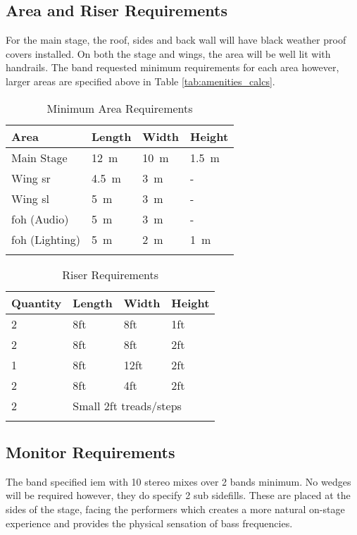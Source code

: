     \subsection{Area and Riser Requirements}
    For the main stage, the roof, sides and back wall will have black weather proof covers installed. On both the stage and wings, the area will be well lit with handrails. The band requested minimum requirements for each area however, larger areas are specified above in Table \ref{tab:amenities_calcs}.

    \begin{longtable}[H]{|l|l|l|l|}
        \hline
        \textbf{Area} & \textbf{Length} & \textbf{Width} & \textbf{Height} \\ \hline
        \endfirsthead
        \endhead
        Main Stage & \SI{12}{\metre} & \SI{10}{\metre} & \SI{1.5}{\metre} \\ \hline
        Wing \gls{sr} & \SI{4.5}{\metre} & \SI{3}{\metre} & - \\ \hline
        Wing \gls{sl} & \SI{5}{\metre} & \SI{3}{\metre} & - \\ \hline
        \gls{foh} (Audio) & \SI{5}{\metre} & \SI{3}{\metre} & - \\ \hline
        \gls{foh} (Lighting) & \SI{5}{\metre} & \SI{2}{\metre} & \SI{1}{\metre} \\ \hline
        \caption{Minimum Area Requirements}
        \label{tab:area_requirements}
    \end{longtable}

    \begin{longtable}[H]{|l|lll|}
        \hline
        \textbf{Quantity} & \multicolumn{1}{l|}{\textbf{Length}} & \multicolumn{1}{l|}{\textbf{Width}} & \textbf{Height} \\ \hline
        \endfirsthead
        \endhead
        2 & \multicolumn{1}{l|}{8ft} & \multicolumn{1}{l|}{8ft} & 1ft \\ \hline
        2 & \multicolumn{1}{l|}{8ft} & \multicolumn{1}{l|}{8ft} & 2ft \\ \hline
        1 & \multicolumn{1}{l|}{8ft} & \multicolumn{1}{l|}{12ft} & 2ft \\ \hline
        2 & \multicolumn{1}{l|}{8ft} & \multicolumn{1}{l|}{4ft} & 2ft \\ \hline
        2 & \multicolumn{3}{l|}{Small 2ft treads/steps} \\ \hline
        \caption{Riser Requirements}
        \label{tab:riser_requirements}
    \end{longtable}

    \subsection{Monitor Requirements}
    The band specified \gls{iem} with 10 stereo mixes over 2 bands minimum. No wedges will be required however, they do specify 2 sub sidefills. These are placed at the sides of the stage, facing the performers which creates a more natural on-stage experience and provides the physical sensation of bass frequencies.